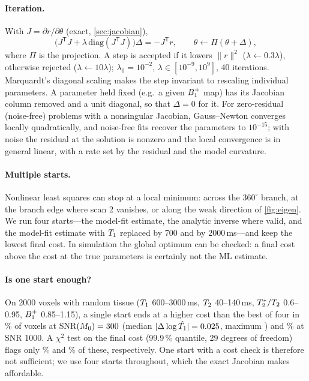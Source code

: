 \paragraph{Iteration.} With $J=\partial r/\partial\theta$ (exact, \cref{sec:jacobian}),
\begin{equation}
  \bigl(J^{\mathsf T}J+\lambda\,\mathrm{diag}(J^{\mathsf T}J)\bigr)\Delta=-J^{\mathsf T}r,\qquad
  \theta\leftarrow\Pi(\theta+\Delta),
\end{equation}
where $\Pi$ is the projection. A step is accepted if it lowers $\|r\|^2$ ($\lambda\leftarrow0.3\lambda$),
otherwise rejected ($\lambda\leftarrow10\lambda$); $\lambda_0=10^{-2}$, $\lambda\in[10^{-9},10^9]$, 40 iterations.
Marquardt's diagonal scaling makes the step invariant to rescaling individual parameters. A
parameter held fixed (e.g.\ a given $B_1^{+}$ map) has its Jacobian column removed and a unit
diagonal, so that $\Delta=0$ for it. For zero-residual (noise-free) problems with a nonsingular
Jacobian, Gauss--Newton converges locally quadratically, and noise-free fits recover the
parameters to $10^{-15}$; with noise the residual at the solution is nonzero and the local
convergence is in general linear, with a rate set by the residual and the model curvature.

\paragraph{Multiple starts.} Nonlinear least squares can stop at a local minimum: across the
$360^\circ$ branch, at the branch edge where scan 2 vanishes, or along the weak direction of
\cref{fig:eigen}. We run four starts---the model-fit estimate, the analytic inverse where
valid, and the model-fit estimate with $T_1$ replaced by 700 and by 2000\,ms---and keep the
lowest final cost. In simulation the global optimum can be checked: a final cost above the
cost at the true parameters is certainly not the ML estimate.

\paragraph{Is one start enough?} On 2000 voxels with random tissue
($T_1$ 600--3000\,ms, $T_2$ 40--140\,ms, $T_2^{*}/T_2$ 0.6--0.95, $B_1^{+}$ 0.85--1.15), a single start
ends at a higher cost than the best of four in \StartWorseThreeHundred\% of voxels at
SNR$(M_0)=300$ (median $|\Delta\log\hat{T_1}|=0.025$, maximum \StartMaxThreeHundred)
and \StartWorseThousand\% at SNR 1000. A $\chi^2$ test on the final cost (99.9\,\% quantile,
29 degrees of freedom) flags only \StartFlaggedThreeHundred\% and \StartFlaggedThousand\% of
these, respectively. One start with a cost check is therefore not sufficient; we use four
starts throughout, which the exact Jacobian makes affordable.

